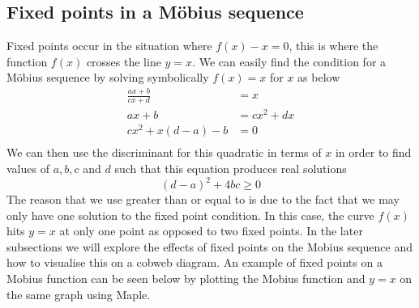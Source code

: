 \documentclass[12pt]{article}
\begin{document}
\subsection{Fixed points in a Möbius sequence}\label{sec:fixedPoints}
Fixed points occur in the situation where $f(x)-x=0$, this is where the function $f(x)$ crosses the line $y=x$. We can easily find the condition for a Möbius sequence by solving symbolically $f(x)=x$ for $x$ as below
	\begin{equation*}
		\begin{split}
			\frac{ax+b}{cx+d}&=x \\[5pt]
			ax+b&=cx^2+dx \\[5pt]
			cx^2+x(d-a)-b&=0 \\[5pt]
		\end{split}
	\end{equation*}
We can then use the discriminant for this quadratic in terms of $x$ in order to find values of $a, b, c$ and $d$ such that this equation produces real solutions
		\[(d-a)^2+4bc\ge0\]
The reason that we use greater than or equal to is due to the fact that we may only have one solution to the fixed point condition. In this case, the curve $f(x)$ hits $y=x$ at only one point as opposed to two fixed points. In the later subsections we will explore the effects of fixed points on the Mobius sequence and how to visualise this on a cobweb diagram. An example of fixed points on a Mobius function can be seen below by plotting the Mobius function and $y=x$ on the same graph using Maple.
\end{document}
